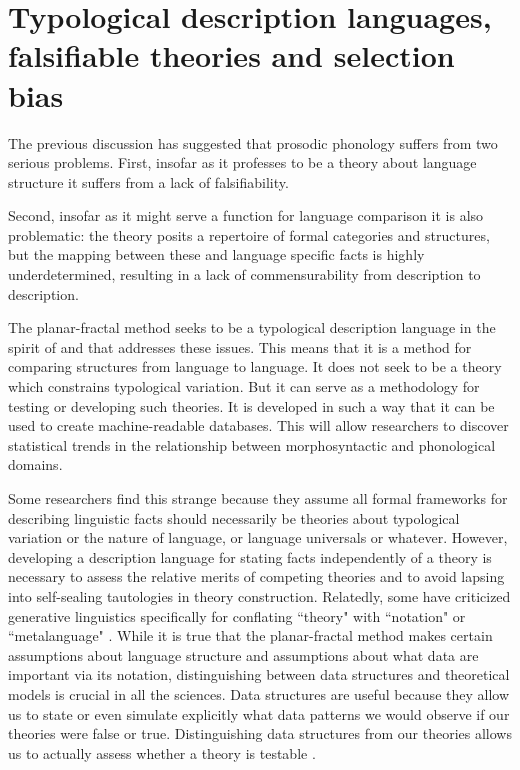 \documentclass[output=paper,hidelinks]{langscibook}
\begin{document}
\section{Typological description languages, falsifiable theories and selection bias} 

\label{sec:descriptionlanguages}

\largerpage[-1]
The previous discussion has suggested that prosodic phonology suffers from two serious problems. First, insofar as it professes to be a theory about language structure it suffers from a lack of falsifiability. 

Second, insofar as it might serve a function for language comparison it is also problematic: the theory posits a repertoire of formal categories and structures, but the mapping between these and language specific facts is highly underdetermined, resulting in a lack of commensurability from description to description. 

The planar-fractal method seeks to be a typological description language in the spirit of \citet{schiering2010prosodic} and \citet{Good:2016} that addresses these issues. This means that it is a method for comparing structures from language to language. It does not seek to be a theory which constrains typological variation. But it can serve as a methodology for testing or developing such theories. It is developed in such a way that it can be used to create machine-readable databases. This will allow researchers to discover statistical trends in the relationship between morphosyntactic and phonological domains. 

Some researchers find this strange because they assume all formal frameworks for describing linguistic facts should necessarily be theories about typological variation or the nature of language, or language universals or whatever. However, developing a description language for stating facts independently of a theory is necessary to assess the relative merits of competing theories and to avoid lapsing into self-sealing tautologies in theory construction. Relatedly, some have criticized generative linguistics specifically for conflating ``theory" with ``notation" or ``metalanguage" \citep{dryer2006functionalism}. While it is true that the planar-fractal method makes certain assumptions about language structure and assumptions about what data are important via its notation, distinguishing between data structures and theoretical models is crucial in all the sciences. Data structures are useful because they allow us to state or even simulate explicitly what data patterns we would observe if our theories were false or true. Distinguishing data structures from our theories allows us to actually assess whether a theory is testable \citep{mayo2018statistical}.  
\end{document}
